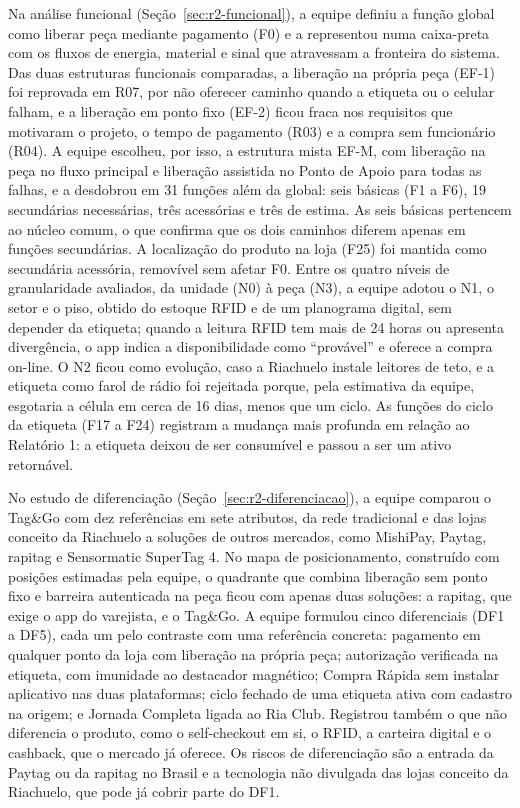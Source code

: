 Na análise funcional (Seção~\ref{sec:r2-funcional}), a equipe definiu a função global como liberar peça mediante pagamento (F0) e a representou numa caixa-preta com os fluxos de energia, material e sinal que atravessam a fronteira do sistema. Das duas estruturas funcionais comparadas, a liberação na própria peça (EF-1) foi reprovada em R07, por não oferecer caminho quando a etiqueta ou o celular falham, e a liberação em ponto fixo (EF-2) ficou fraca nos requisitos que motivaram o projeto, o tempo de pagamento (R03) e a compra sem funcionário (R04). A equipe escolheu, por isso, a estrutura mista EF-M, com liberação na peça no fluxo principal e liberação assistida no Ponto de Apoio para todas as falhas, e a desdobrou em 31 funções além da global: seis básicas (F1 a F6), 19 secundárias necessárias, três acessórias e três de estima. As seis básicas pertencem ao núcleo comum, o que confirma que os dois caminhos diferem apenas em funções secundárias. A localização do produto na loja (F25) foi mantida como secundária acessória, removível sem afetar F0. Entre os quatro níveis de granularidade avaliados, da unidade (N0) à peça (N3), a equipe adotou o N1, o setor e o piso, obtido do estoque RFID e de um planograma digital, sem depender da etiqueta; quando a leitura RFID tem mais de 24 horas ou apresenta divergência, o app indica a disponibilidade como ``provável'' e oferece a compra on-line. O N2 ficou como evolução, caso a Riachuelo instale leitores de teto, e a etiqueta como farol de rádio foi rejeitada porque, pela estimativa da equipe, esgotaria a célula em cerca de 16 dias, menos que um ciclo. As funções do ciclo da etiqueta (F17 a F24) registram a mudança mais profunda em relação ao Relatório 1: a etiqueta deixou de ser consumível e passou a ser um ativo retornável.

No estudo de diferenciação (Seção~\ref{sec:r2-diferenciacao}), a equipe comparou o Tag\&Go com dez referências em sete atributos, da rede tradicional e das lojas conceito da Riachuelo a soluções de outros mercados, como MishiPay, Paytag, rapitag e Sensormatic SuperTag 4. No mapa de posicionamento, construído com posições estimadas pela equipe, o quadrante que combina liberação sem ponto fixo e barreira autenticada na peça ficou com apenas duas soluções: a rapitag, que exige o app do varejista, e o Tag\&Go. A equipe formulou cinco diferenciais (DF1 a DF5), cada um pelo contraste com uma referência concreta: pagamento em qualquer ponto da loja com liberação na própria peça; autorização verificada na etiqueta, com imunidade ao destacador magnético; Compra Rápida sem instalar aplicativo nas duas plataformas; ciclo fechado de uma etiqueta ativa com cadastro na origem; e Jornada Completa ligada ao Ria Club. Registrou também o que não diferencia o produto, como o self-checkout em si, o RFID, a carteira digital e o cashback, que o mercado já oferece. Os riscos de diferenciação são a entrada da Paytag ou da rapitag no Brasil e a tecnologia não divulgada das lojas conceito da Riachuelo, que pode já cobrir parte do DF1.

